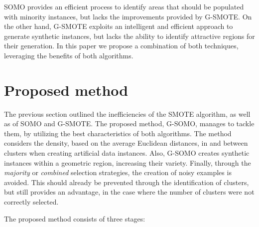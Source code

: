 \documentclass[parskip=full]{scrartcl}
\begin{document}
SOMO provides an efficient process to identify areas that should be populated
with minority instances, but lacks the improvements provided by G-SMOTE. On the
other hand, G-SMOTE exploits an intelligent and efficient approach to generate
synthetic instances, but lacks the ability to identify attractive regions for their generation. In this paper we propose a combination of both techniques,
leveraging the benefits of both algorithms.

\section{Proposed method}

The previous section outlined the inefficiencies of the SMOTE algorithm, as well as of SOMO and G-SMOTE. The proposed method, G-SOMO, manages to tackle them, by utilizing the best characteristics of both algorithms. The method considers the density, based on the average Euclidean distances, in and between clusters when creating artificial data instances. Also, G-SOMO creates synthetic instances within a geometric region, increasing their variety. Finally, through the \textit{majority} or \textit{combined} selection strategies, the creation of noisy examples is avoided. This should already be prevented through the identification of clusters, but still provides an advantage, in the case where the number of clusters were not correctly selected.

The proposed method consists of three stages:
\end{document}
